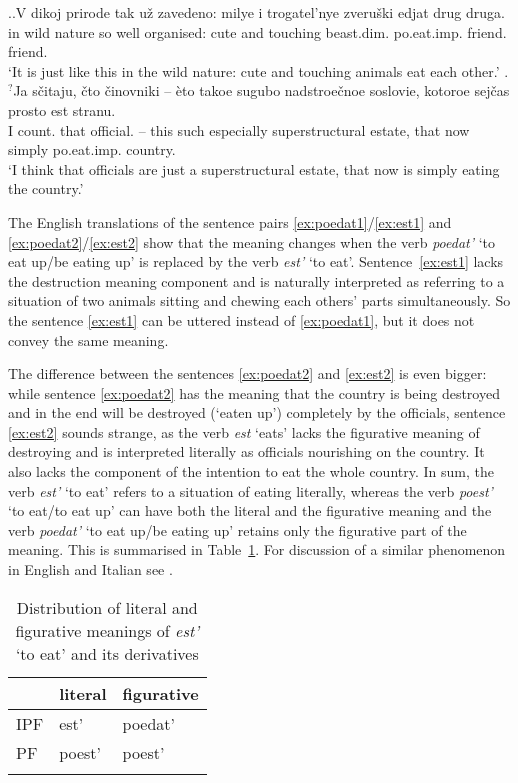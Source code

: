 \ex.\ag.\label{ex:est1}V dikoj prirode tak u\v{z} zavedeno: milye i trogatel'nye zveru\v{s}ki edjat drug druga.\\
in wild nature so well organised: cute and touching beast.dim. po.eat.imp. friend. friend.\\
\trans `It is just like this in the wild nature: cute and touching animals eat each other.'
\bg.$^?$Ja s\v{c}itaju, \v{c}to \v{c}inovniki -- \`{e}to takoe sugubo nadstroe\v{c}noe soslovie, kotoroe sej\v{c}as prosto est stranu.\label{ex:est2}\\
I count. that official. -- this such especially superstructural estate, that now simply po.eat.imp. country.\\
\trans `I think that officials are just a superstructural estate, that now is simply eating the country.'

The English translations of the sentence pairs \ref{ex:poedat1}/\ref{ex:est1} and \ref{ex:poedat2}/\ref{ex:est2} show that  the meaning changes when the verb \textit{poedat'} `to eat up/be eating up' is replaced by the verb \textit{est'} `to eat'. Sentence~\ref{ex:est1} lacks the destruction meaning component and is naturally interpreted as referring to a situation of two animals sitting and chewing each others' parts simultaneously. So the sentence \ref{ex:est1} can be uttered instead of \ref{ex:poedat1}, but it does not convey the same meaning.

The difference between the sentences \ref{ex:poedat2} and \ref{ex:est2} is even bigger: while sentence \ref{ex:poedat2} has the meaning that the country is being destroyed and in the end will be destroyed (`eaten up') completely by the officials, sentence \ref{ex:est2} sounds strange, as the verb \textit{est} `eats' lacks the figurative meaning of destroying and is interpreted literally as officials nourishing on the country. It also lacks the component of the intention to eat the whole country. In sum, the verb \textit{est'} `to eat' refers to a situation of eating literally, whereas the verb \textit{poest'} `to eat/to eat up' can have both the literal and the figurative meaning and the verb \textit{poedat'} `to eat up/be eating up' retains only the figurative part of the meaning. This is summarised in Table~\ref{table:eat}. For discussion of a similar phenomenon in English and Italian see \citet{FolliHarley:05}.\largerpage

\begin{table}
\caption{Distribution of literal and figurative meanings of \textit{est'} `to eat' and its derivatives \label{table:eat}}
\begin{tabular}{lll}
\lsptoprule
& literal & figurative \\ \midrule
IPF & est' & poedat' \\
PF & poest' & poest' \\ \lspbottomrule
\end{tabular}
\end{table}

